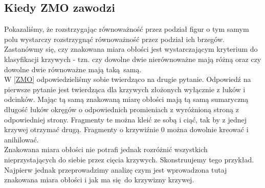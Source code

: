 \documentclass[a4paper, 12pt, twosided]{article}
\begin{document}
\subsection{Kiedy ZMO zawodzi}
Pokazaliśmy, że rozstrzygając równoważność przez podział figur o tym samym polu wystarczy 
rozstrzygnąć
równoważność przez podział ich brzegów. Zastanówmy się, czy znakowana miara obłości jest 
wystarczającym
kryterium do klasyfikacji krzywych - tzn. czy dowolne dwie nierównoważne mają różną oraz czy dowolne
dwie równoważne mają taką samą. \\
W \ref{ZMO} odpowiedzieliśmy sobie twierdząco na drugie pytanie.
Odpowiedź na pierwsze pytanie jest twierdząca dla krzywych złożonych wyłącznie z łuków i odcinków.
Mając tą samą znakowaną miarę obłości mają tą samą sumaryczną długość łuków okręgów o odpowiednich
promieniach z wyróżnioną stroną z odpowiedniej strony. Fragmenty te można kleić ze sobą i ciąć, tak 
by
z jednej krzywej otrzymać drugą. Fragmenty o krzywiźnie 0 można dowolnie kreować i anihilować. \\
Znakowana miara obłości nie potrafi jednak rozróżnić wszystkich nieprzystających do siebie przez 
cięcia
krzywych. Skonstruujemy tego przykład. Najpierw jednak przeprowadzimy analizę czym jest
wprowadzona tutaj znakowana miara obłości i jak ma się do krzywizny krzywej.
\end{document}
